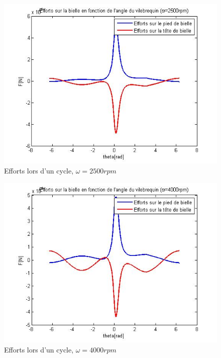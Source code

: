 \documentclass[a4paper,oneside,12pt]{report}
\begin{document}
\begin{figure}[H]
\center
\includegraphics[scale=0.7]{effort_2500rpm.jpg}
\caption{Efforts lors d'un cycle, $\omega=2500rpm$}
\end{figure}

\begin{figure}[H]
\center
\includegraphics[scale=0.7]{effort_4000rpm.jpg}
\caption{Efforts lors d'un cycle, $\omega=4000rpm$}
\end{figure}
\end{document}
